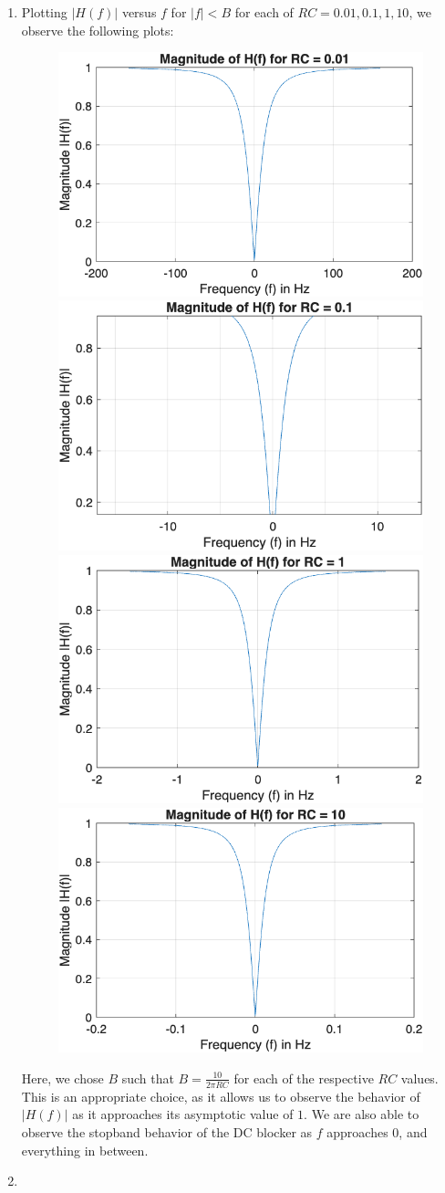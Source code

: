 \documentclass[11pt]{article}
\begin{document}
\begin{enumerate}[label=\textbf{\alph*)}, leftmargin=2.6em]
    \item Plotting $|H(f)|$ versus $f$ for $|f|<B$ for each of $RC=0.01,0.1,1,10$, we
    observe the following plots:
    \begin{figure} [H]
        \centering
        \includegraphics[width=0.4\linewidth]{plot2.png}
        \includegraphics[width=0.4\linewidth]{plot3.png}
        \includegraphics[width=0.4\linewidth]{plot4.png}
        \includegraphics[width=0.4\linewidth]{plot5.png}
    \end{figure}
    Here, we chose $B$ such that $B=\frac{10}{2\pi RC}$ for each of the
    respective $RC$ values. This is an appropriate choice, as it allows us to
    observe the behavior of $|H(f)|$ as it approaches its asymptotic value
    of $1$. We are also able to observe the stopband behavior of the DC blocker
    as $f$ approaches $0$, and everything in between.

    \item 


\end{enumerate}
\end{document}
